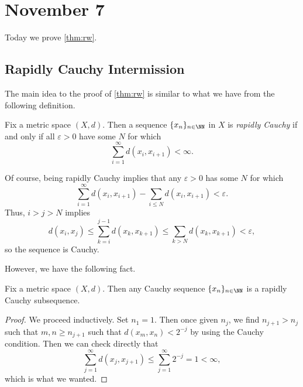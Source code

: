\documentclass[../notes.tex]{subfiles}
\begin{document}
\section{November 7}

Today we prove \autoref{thm:rw}.

\subsection{Rapidly Cauchy Intermission}
The main idea to the proof of \autoref{thm:rw} is similar to what we have from the following definition.
\begin{definition}
	Fix a metric space $(X,d)$. Then a sequence $\{x_n\}_{n\in\NN}$ in $X$ is \textit{rapidly Cauchy} if and only if all $\varepsilon>0$ have some $N$ for which
	\[\sum_{i=1}^\infty d(x_i,x_{i+1})<\infty.\]
\end{definition}
\begin{remark}
	Of course, being rapidly Cauchy implies that any $\varepsilon>0$ has some $N$ for which
	\[\sum_{i=1}^\infty d(x_i,x_{i+1})-\sum_{i\le N}d(x_i,x_{i+1})<\varepsilon.\]
	Thus, $i>j>N$ implies
	\[d(x_i,x_j)\le\sum_{k=i}^{j-1}d(x_k,x_{k+1})\le\sum_{k>N}d(x_k,x_{k+1})<\varepsilon,\]
	so the sequence is Cauchy.
\end{remark}
However, we have the following fact.
\begin{proposition} \label{prop:cauchy-has-rapidly-cauchy}
	Fix a metric space $(X,d)$. Then any Cauchy sequence $\{x_n\}_{n\in\NN}$ is a rapidly Cauchy subsequence.
\end{proposition}
\begin{proof}
	We proceed inductively. Set $n_1=1$. Then once given $n_j$, we find $n_{j+1}>n_j$ such that $m,n\ge n_{j+1}$ such that $d(x_m,x_n)<2^{-j}$ by using the Cauchy condition. Then we can check directly that
	\[\sum_{j=1}^\infty d(x_j,x_{j+1})\le\sum_{j=1}^\infty2^{-j}=1<\infty,\]
	which is what we wanted.
\end{proof}
\end{document}
